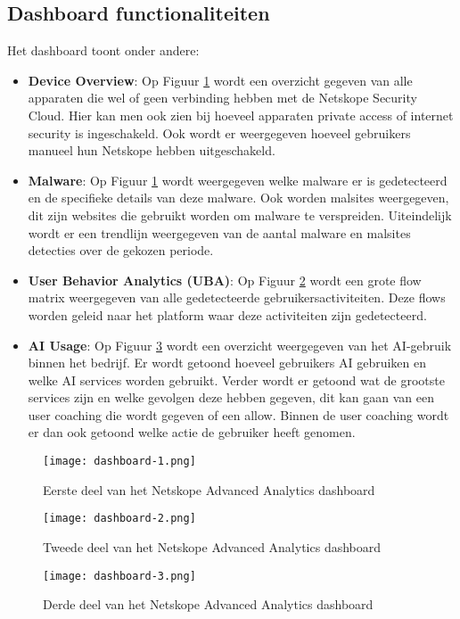 \subsection{Dashboard functionaliteiten}
Het dashboard toont onder andere:
\begin{itemize}
    \item \textbf{Device Overview}: Op Figuur \ref{fig:dashboard-1} wordt een overzicht gegeven van alle apparaten die wel of geen verbinding hebben met de Netskope Security Cloud. Hier kan men ook zien bij hoeveel apparaten private access of internet security is ingeschakeld. Ook wordt er weergegeven hoeveel gebruikers manueel hun Netskope hebben uitgeschakeld.
    \item \textbf{Malware}: Op Figuur \ref{fig:dashboard-1} wordt weergegeven welke malware er is gedetecteerd en de specifieke details van deze malware. Ook worden malsites weergegeven, dit zijn websites die gebruikt worden om malware te verspreiden. Uiteindelijk wordt er een trendlijn weergegeven van de aantal malware en malsites detecties over de gekozen periode.
    \item \textbf{User Behavior Analytics (UBA)}: Op Figuur \ref{fig:dashboard-2} wordt een grote flow matrix weergegeven van alle gedetecteerde gebruikersactiviteiten. Deze flows worden geleid naar het platform waar deze activiteiten zijn gedetecteerd.
    \item \textbf{AI Usage}: Op Figuur \ref{fig:dashboard-3} wordt een overzicht weergegeven van het AI-gebruik binnen het bedrijf. Er wordt getoond hoeveel gebruikers AI gebruiken en welke AI services worden gebruikt. Verder wordt er getoond wat de grootste services zijn en welke gevolgen deze hebben gegeven, dit kan gaan van een user coaching die wordt gegeven of een allow. Binnen de user coaching wordt er dan ook getoond welke actie de gebruiker heeft genomen.
\end{itemize}

\begin{figure}[H]
    \centering
    \texttt{[image: dashboard-1.png]}
    \caption[Netskope Advanced Analytics dashboard - Deel 1]{Eerste deel van het Netskope Advanced Analytics dashboard}
    \label{fig:dashboard-1}
\end{figure}
\begin{figure}[H]
    \centering
    \texttt{[image: dashboard-2.png]}
    \caption[Netskope Advanced Analytics dashboard - Deel 2]{Tweede deel van het Netskope Advanced Analytics dashboard}
    \label{fig:dashboard-2}
\end{figure}
\begin{figure}[H]
    \centering
    \texttt{[image: dashboard-3.png]}
    \caption[Netskope Advanced Analytics dashboard - Deel 3]{Derde deel van het Netskope Advanced Analytics dashboard}
    \label{fig:dashboard-3}
\end{figure}


